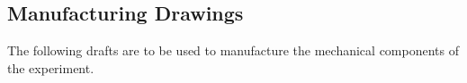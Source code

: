 \subsection{Manufacturing Drawings}
\label{sec:mech_drawings}

The following drafts are to be used to manufacture the mechanical components
of the experiment.


% 
% 




